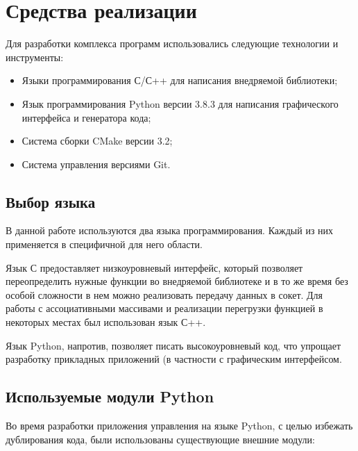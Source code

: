 \section{Средства реализации}

Для разработки комплекса программ использовались следующие технологии и
инструменты:

\begin{itemize}
	\item Языки программирования С/С++ для написания внедряемой библиотеки;
	\item Язык программирования Python версии 3.8.3 для написания графического
		интерфейса и генератора кода;
	\item Система сборки CMake версии 3.2;
	\item Система управления версиями Git.
\end{itemize}

\subsection{Выбор языка}

В данной работе используются два языка программирования. Каждый из них применяется
в специфичной для него области.

Язык С предоставляет низкоуровневый интерфейс, который позволяет
переопределить нужные функции во внедряемой библиотеке и в то же время
без особой сложности в нем можно реализовать передачу данных в сокет.
Для работы с ассоциативными массивами и реализации перегрузки функцией в
некоторых местах был использован язык С++.

Язык Python, напротив, позволяет писать высокоуровневый код, что
упрощает разработку прикладных приложений (в частности с графическим
интерфейсом.

\subsection{Используемые модули Python}

Во время разработки приложения управления на языке Python, с целью избежать
дублирования кода, были использованы существующие внешние модули:

